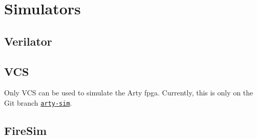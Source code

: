 \chapter{Simulators}\label{chap:Simulators}

\section{Verilator}\label{sec:Verilator_Simulator}

\section{VCS}\label{sec:VCS_Simulator}
Only VCS can be used to simulate the Arty \Gls{fpga}.
Currently, this is only on the Git branch \href{https://github.com/ucb-bar/chipyard/tree/arty-sim}{\texttt{arty-sim}}.

\section{FireSim}\label{sec:FireSim_Simulator}
\nocite{firesimPresentation}

